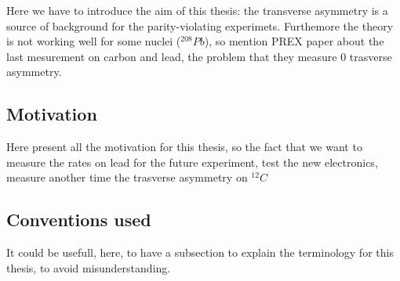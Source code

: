 Here we have to introduce the aim of this thesis: the transverse asymmetry is a source of background for the parity-violating experimets. Furthemore the theory is not working well for some nuclei ($^{208}Pb$), so mention PREX paper about the last mesurement on carbon and lead, the problem that they measure $0$ trasverse asymmetry.

\subsection{Motivation}
Here present all the motivation for this thesis, so the fact that we want to measure the rates on lead for the future experiment, test the new electronics, measure another time the trasverse asymmetry on $^{12}C$

\subsection{Conventions used}
It could be usefull, here, to have a subsection to explain the terminology for this thesis, to avoid misunderstanding.
